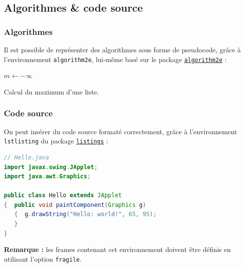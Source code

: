 \documentclass[10pt,    %
    french,             %
    xcolor=table,       %
    envcountsect        %
]{beamer}
\begin{document}
\subsection{Algorithmes \& code source}
\begin{frame}
    \frametitle{Algorithmes}
    
    Il est possible de représenter des algorithmes sous forme de pseudocode, grâce à l'environnement \texttt{algorithm2e}, lui-même basé sur le package \href{https://ctan.org/pkg/algorithm2e?lang=en}{\texttt{algorithm2e}} :
    
    \begin{algorithm2e}[H]
        \DontPrintSemicolon             %
	
	    \BlankLine                      %
	    $m \leftarrow -\infty$\;        %
	
	    \BlankLine

    	\caption{Calcul du maximum d'une liste.}
        \label{alg:max}
    \end{algorithm2e}
\end{frame}

\begin{frame}[fragile]
    \frametitle{Code source}
    \label{frm:sourcecode}
    
    On peut insérer du code source formaté correctement, grâce à l'environnement \texttt{lstlisting} du package \href{https://ctan.org/pkg/listings?lang=en}{\texttt{listings}} :
    
    \begin{lstlisting}[language=Java,caption={Applet Java Hello World.},label={lst:hello}]
// Hello.java
import javax.swing.JApplet;
import java.awt.Graphics;

public class Hello extends JApplet
{  public void paintComponent(Graphics g) 
   {  g.drawString("Hello: world!", 65, 95);
   }    
}
    \end{lstlisting}
    
    \vspace{0.25cm}
    \textbf{Remarque :} les frames contenant cet environnement doivent être définis en utilisant l'option \texttt{fragile}.
\end{frame}
\end{document}
